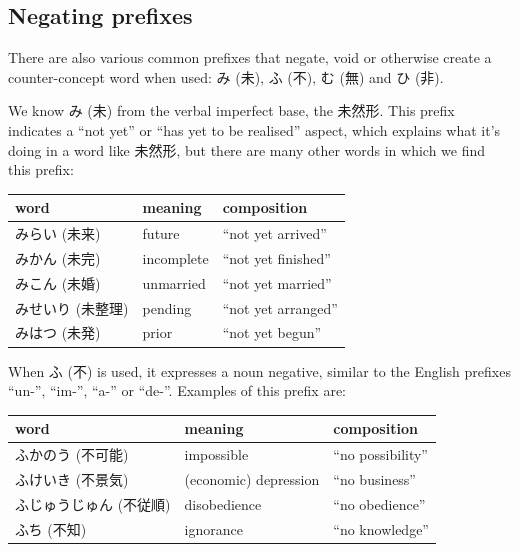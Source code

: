 \documentclass[11pt, b5paper, twoside, openright, onecolumn]{book}
\makeatletter
\newcommand*{\rtrubystack}[2]{{\relscale{0.5}%
  \begin{tabular}[b]{@{}c@{}}%
    {#1}\\%
    {\textscale{2}{#2}}%
  \end{tabular}}%
}
\DeclareRobustCommand*{\rtruby}[2]{%
  \mbox{%
    \setlength{\parskip}{0ex}%
    \BeginAccSupp{method=pdfstringdef,ActualText={#1}}%
      \rtrubystack{\phantom{#2}}{#1}%
      \llap{%
        \rtrubystack{#2}{\phantom{#1}}%
      }%
    \EndAccSupp{}%
  }%
}
\newcommand*{\rubystack}[2]{{\relscale{0.5}%
  \begin{tabular}[b]{@{}c@{}}%
    {#1}\\%
   {\textscale{2}{#2}}%
  \end{tabular}}%
}
\DeclareRobustCommand*{\ruby}[2]{%
  \mbox{%
    \setlength{\parskip}{0ex}%
    \BeginAccSupp{method=pdfstringdef,ActualText={#1}}%
      \rubystack{\phantom{#2}}{#1}%
      \llap{%
        \rubystack{#2}{\phantom{#1}}%
      }%
    \EndAccSupp{}%
  }%
}
\renewcommand*{\rtruby}[2]{#2 (#1)}%
\renewcommand*{\ruby}[2]{#2 (#1)}%
\newenvironment{mytabular}[1]{\noindent\hspace{0.4in}
\begin{tabular}[h]{#1}}{\end{tabular}}
\makeatother
\begin{document}
\subsection{Negating prefixes}


There are also various common prefixes that negate‚ void or otherwise create a counter-concept word when used: \ruby{未}{み}‚ \ruby{不}{ふ}‚ \ruby{無}{む} and \ruby{非}{ひ}.

We know \ruby{未}{み} from the verbal imperfect base‚ the 未然形. This prefix indicates a “not yet” or “has yet to be realised” aspect‚ which explains what it’s doing in a word like 未然形‚ but there are many other words in which we find this prefix:

\vspace{0.5cm}
\smaller
\begin{mytabular}{| l  l  l |}\hline 
\rule{0pt}{2.4ex}word & meaning & composition\\ 
\hline
\rule{0pt}{3.6ex}\rtruby{未来}{みらい} & future & “not yet arrived”\\ 
\rule{0pt}{3.6ex}\rtruby{未完}{みかん} & incomplete & “not yet finished”\\ 
\rule{0pt}{3.6ex}\rtruby{未婚}{みこん} & unmarried & “not yet married”\\ 
\rule{0pt}{3.6ex}\rtruby{未整理}{みせいり} & pending & “not yet arranged”\\ 
\rule{0pt}{3.6ex}\rtruby{未発}{みはつ} & prior & “not yet begun”\\ 
\hline 
\end{mytabular}
\larger
\vspace{0.5cm}


When \ruby{不}{ふ} is used‚ it expresses a noun negative‚ similar to the English prefixes “un-”‚ “im-”‚ “a-” or “de-”. Examples of this prefix are:

\vspace{0.5cm}
\smaller
\begin{mytabular}{| l  l  l |}\hline 
\rule{0pt}{2.4ex}word & meaning & composition\\ 
\hline
\rule{0pt}{3.6ex}\rtruby{不可能}{ふかのう} & impossible & “no possibility”\\ 
\rule{0pt}{3.6ex}\rtruby{不景気}{ふけいき} & (economic) depression & “no business”\\ 
\rule{0pt}{3.6ex}\rtruby{不従順}{ふじゅうじゅん} & disobedience & “no obedience”\\ 
\rule{0pt}{3.6ex}\rtruby{不知}{ふち} & ignorance & “no knowledge”\\ 
\hline 
\end{mytabular}
\larger
\vspace{0.5cm}
\end{document}

